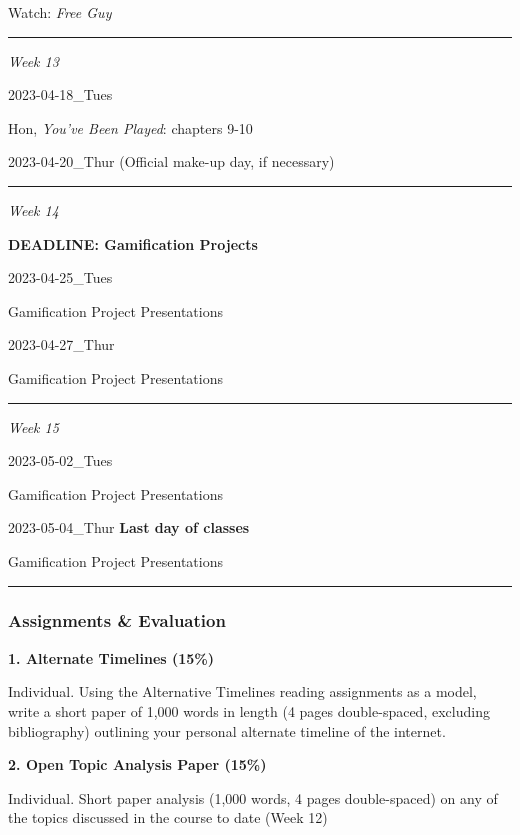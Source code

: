 \documentclass[
  letterpaper,
  DIV=11,
  numbers=noendperiod]{scrartcl}
\begin{document}
Watch: \emph{Free Guy}

\begin{center}\rule{0.5\linewidth}{0.5pt}\end{center}

\emph{Week 13}

2023-04-18\_Tues

Hon, \emph{You've Been Played}: chapters 9-10

2023-04-20\_Thur (Official make-up day, if necessary)

\begin{center}\rule{0.5\linewidth}{0.5pt}\end{center}

\emph{Week 14}

\textbf{DEADLINE: Gamification Projects}

2023-04-25\_Tues

Gamification Project Presentations

2023-04-27\_Thur

Gamification Project Presentations

\begin{center}\rule{0.5\linewidth}{0.5pt}\end{center}

\emph{Week 15}

2023-05-02\_Tues

Gamification Project Presentations

2023-05-04\_Thur \textbf{Last day of classes}

Gamification Project Presentations

\begin{center}\rule{0.5\linewidth}{0.5pt}\end{center}

\hypertarget{assignments-evaluation}{%
\subsubsection{Assignments \& Evaluation}\label{assignments-evaluation}}

\textbf{1. Alternate Timelines (15\%)}

Individual. Using the Alternative Timelines reading assignments as a
model, write a short paper of 1,000 words in length (4 pages
double-spaced, excluding bibliography) outlining your personal alternate
timeline of the internet.

\textbf{2. Open Topic Analysis Paper (15\%)}

Individual. Short paper analysis (1,000 words, 4 pages double-spaced) on
any of the topics discussed in the course to date (Week 12)
\end{document}
